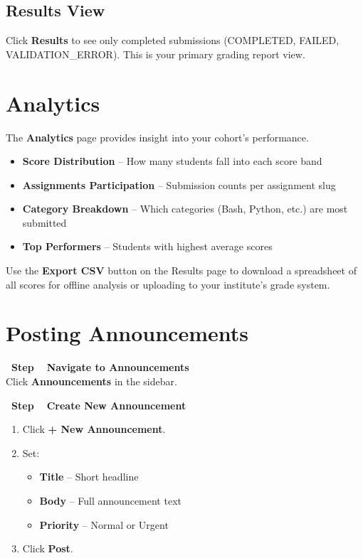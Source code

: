 \documentclass[12pt,a4paper]{article}
\newcounter{stepnum}
\newcommand{\step}[1]{%
  \stepcounter{stepnum}%
  \vspace{6pt}%
  \noindent\colorbox{mentorPurple}{\color{white}\bfseries\small\ Step \thestepnum\ }%
  \hspace{4pt}\textbf{#1}\\[4pt]%
}
\begin{document}
\subsection{Results View}

Click \textbf{Results} to see only completed submissions (COMPLETED, FAILED, VALIDATION\_ERROR). This is your primary grading report view.

\section{Analytics}

The \textbf{Analytics} page provides insight into your cohort's performance.

\begin{itemize}
  \item \textbf{Score Distribution} -- How many students fall into each score band
  \item \textbf{Assignments Participation} -- Submission counts per assignment slug
  \item \textbf{Category Breakdown} -- Which categories (Bash, Python, etc.) are most submitted
  \item \textbf{Top Performers} -- Students with highest average scores
\end{itemize}

\begin{tipbox}
  Use the \textbf{Export CSV} button on the Results page to download a spreadsheet of all scores for offline analysis or uploading to your institute's grade system.
\end{tipbox}

\section{Posting Announcements}

\setcounter{stepnum}{0}

\step{Navigate to Announcements} Click \textbf{Announcements} in the sidebar.

\step{Create New Announcement}
\begin{enumerate}
  \item Click \textbf{+ New Announcement}.
  \item Set:
    \begin{itemize}
      \item \textbf{Title} -- Short headline
      \item \textbf{Body} -- Full announcement text
      \item \textbf{Priority} -- Normal or Urgent
    \end{itemize}
  \item Click \textbf{Post}.
\end{enumerate}
\end{document}

